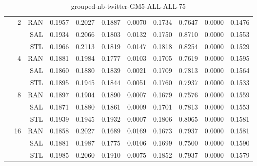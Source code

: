\begin{center}
\begin{table}[htbp]
\begin{tabular}{ | r | r | r | r | r | r | r | r | r | r | r |}
 & \multirow{3}{*}{2} & RAN & 0.1957 & 0.2027 & 0.1887 & 0.0070 & 0.1734 & 0.7647 & 0.0000 & 0.1476\\ \cline{3-11}
 &   & SAL & 0.1934 & 0.2066 & 0.1803 & 0.0132 & 0.1750 & 0.8710 & 0.0000 & 0.1553\\ \cline{3-11}
 &   & STL & 0.1966 & 0.2113 & 0.1819 & 0.0147 & 0.1818 & 0.8254 & 0.0000 & 0.1529\\ \cline{2-11}
 & \multirow{3}{*}{4} & RAN & 0.1881 & 0.1984 & 0.1777 & 0.0103 & 0.1705 & 0.7619 & 0.0000 & 0.1595\\ \cline{3-11}
 &   & SAL & 0.1860 & 0.1880 & 0.1839 & 0.0021 & 0.1709 & 0.7813 & 0.0000 & 0.1564\\ \cline{3-11}
 &   & STL & 0.1895 & 0.1945 & 0.1844 & 0.0051 & 0.1760 & 0.7937 & 0.0000 & 0.1533\\ \cline{2-11}
 & \multirow{3}{*}{8} & RAN & 0.1897 & 0.1904 & 0.1890 & 0.0007 & 0.1679 & 0.7576 & 0.0000 & 0.1559\\ \cline{3-11}
 &   & SAL & 0.1871 & 0.1880 & 0.1861 & 0.0009 & 0.1701 & 0.7813 & 0.0000 & 0.1553\\ \cline{3-11}
 &   & STL & 0.1939 & 0.1945 & 0.1932 & 0.0007 & 0.1806 & 0.8065 & 0.0000 & 0.1581\\ \cline{2-11}
 & \multirow{3}{*}{16} & RAN & 0.1858 & 0.2027 & 0.1689 & 0.0169 & 0.1673 & 0.7937 & 0.0000 & 0.1581\\ \cline{3-11}
 &   & SAL & 0.1881 & 0.1987 & 0.1775 & 0.0106 & 0.1699 & 0.7500 & 0.0000 & 0.1590\\ \cline{3-11}
 &   & STL & 0.1985 & 0.2060 & 0.1910 & 0.0075 & 0.1852 & 0.7937 & 0.0000 & 0.1579\\ \cline{2-11}
\hline
\end{tabular}
\caption{grouped-nb-twitter-GM5-ALL-ALL-75}
\end{table}
\end{center}

